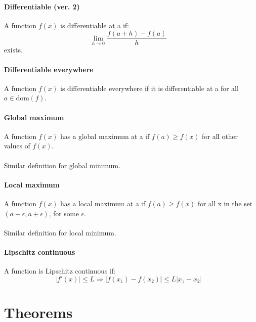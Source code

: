 \documentclass{scrartcl}
\begin{document}
\paragraph{Differentiable (ver. 2)}
A function $ f(x) $ is differentiable at a if:
\begin{equation}
\lim_{h \to 0}\frac{f(a + h) - f(a)}{h}
\end{equation}
exists.
\paragraph{Differentiable everywhere}
A function $ f(x) $ is differentiable everywhere if it is differentiable at a for all $ a \in \textrm{dom}(f) $.
\paragraph{Global maximum}
A function $ f(x) $ has a global maximum at a if $ f(a) \geq f(x) $ for all other values of $ f(x) $.
\\\\
Similar definition for global minimum.
\paragraph{Local maximum}
A function $ f(x) $ has a local maximum at a if $ f(a) \geq f(x) $ for all x in the set $ (a - \epsilon, a + \epsilon) $, for some $ \epsilon $.
\\\\
Similar definition for local minimum.
\paragraph{Lipschitz continuous}
A function is Lipschitz continuous if:
\begin{equation}
|f'(x)| \leq L \Rightarrow |f(x_{1}) - f(x_{2})| \leq L|x_{1} - x_{2}|
\end{equation}

\section{Theorems}
\end{document}
